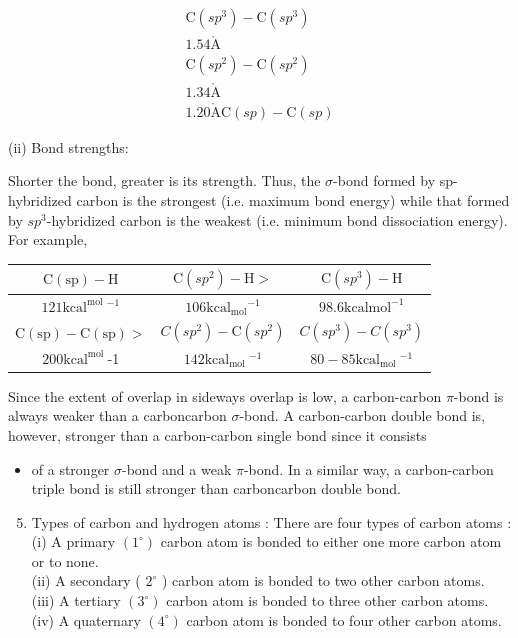 \documentclass[10pt]{article}
\def\AA{\mathring{\mathrm{A}}}
\begin{document}
$$
\begin{gathered}
\mathrm{C}\left(s p^{3}\right)-\mathrm{C}\left(s p^{3}\right) \\
1.54 \AA \\
\mathrm{C}\left(s p^{2}\right)-\mathrm{C}\left(s p^{2}\right) \\
1.34 \AA \\
1.20 \AA \mathrm{C}(s p)-\mathrm{C}(s p)
\end{gathered}
$$

(ii) Bond strengths:

Shorter the bond, greater is its strength. Thus, the $\sigma$-bond formed by sp-hybridized carbon is the strongest (i.e. maximum bond energy) while that formed by $s p^{3}$-hybridized carbon is the weakest (i.e. minimum bond dissociation energy). For example,

\begin{center}
\begin{tabular}{|c|c|c|}
\hline
$\mathrm{C}(\mathrm{sp})-\mathrm{H}$ & $\mathrm{C}\left(s p^{2}\right)-\mathrm{H}>$ & $\mathrm{C}\left(s p^{3}\right)-\mathrm{H}$ \\
\hline
$121 \mathrm{kcal}^{\text {mol }}{ }^{-1}$ & $106 \mathrm{kcal}_{\mathrm{mol}}{ }^{-1}$ & $98.6 \mathrm{kcal} \mathrm{mol}^{-1}$ \\
\hline
$\mathrm{C}(\mathrm{sp})-\mathrm{C}(\mathrm{sp})>$ & $C\left(s p^{2}\right)-\mathrm{C}\left(s p^{2}\right)$ & $C\left(s p^{3}\right)-C\left(s p^{3}\right)$ \\
\hline
$200 \mathrm{kcal}^{\text {mol }}$-1 & $142 \mathrm{kcal}_{\text {mol }}{ }^{-1}$ & $80-85 \mathrm{kcal}_{\text {mol }}{ }^{-1}$ \\
\hline
\end{tabular}
\end{center}

Since the extent of overlap in sideways overlap is low, a carbon-carbon $\pi$-bond is always weaker than a carboncarbon $\sigma$-bond. A carbon-carbon double bond is, however, stronger than a carbon-carbon single bond since it consists

\begin{itemize}
  \item of a stronger $\sigma$-bond and a weak $\pi$-bond. In a similar way, a carbon-carbon triple bond is still stronger than carboncarbon double bond.
\end{itemize}

\begin{enumerate}
  \setcounter{enumi}{4}
  \item Types of carbon and hydrogen atoms : There are four types of carbon atoms :\\
(i) A primary $\left(1^{\circ}\right)$ carbon atom is bonded to either one more carbon atom or to none.\\
(ii) A secondary ( $2^{\circ}$ ) carbon atom is bonded to two other carbon atoms.\\
(iii) A tertiary $\left(3^{\circ}\right)$ carbon atom is bonded to three other carbon atoms.\\
(iv) A quaternary $\left(4^{\circ}\right)$ carbon atom is bonded to four other carbon atoms.
\end{enumerate}
\end{document}
